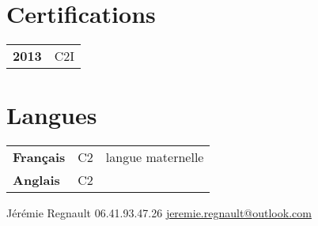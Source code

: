 \documentclass[lighthipster]{simplehipstercv}
\newlength{\rightcolwidth}
\begin{document}
\begin{paracol}{2}
\begin{minipage}[t]{0.3\textwidth}
\section*{Certifications}
\begin{tabular}{>{\footnotesize\bfseries}r >{\footnotesize}p{}}
    2013 & C2I \\
\end{tabular}
\bigskip

\section*{Langues}
\begin{tabular}{l | ll}
\textbf{Français} & C2 & {\phantom{x}\footnotesize langue maternelle} \\
\textbf{Anglais} & C2 & %
\end{tabular}
\bigskip

\end{minipage}\hfill







\vfill{} %

\setlength{\parindent}{0pt}
\begin{minipage}[t]{\rightcolwidth}
\begin{center}\fontfamily{\sfdefault}\selectfont \color{black!70}
{\small Jérémie Regnault  06.41.93.47.26  \protect\url{jeremie.regnault@outlook.com}
}
\end{center}
\end{minipage}

\end{paracol}
\end{document}
